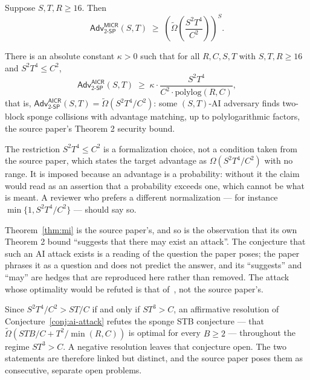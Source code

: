 \documentclass{conjura-conjecture}
\newcommand{\SP}{\mathsf{SP}}
\newcommand{\Adv}{\mathsf{Adv}}
\newcommand{\AICR}{\mathsf{AICR}}
\newcommand{\MICR}{\mathsf{MICR}}
\newcommand{\tOm}{\tilde{\Omega}}
\begin{document}
\begin{theorem}\label{thm:mi}
Suppose $S, T, R \ge 16$. Then
\[
  \Adv^{\MICR}_{2\text{-}\SP}(S,T)
  \;\ge\; \left(\tOm\!\left(\frac{S^{2}T^{4}}{C^{2}}\right)\right)^{S}.
\]
\end{theorem}

\begin{conjecture}\label{conj:ai-attack}
There is an absolute constant $\kappa > 0$ such that for all
$R, C, S, T$ with $S, T, R \ge 16$ and $S^{2}T^{4} \le C^{2}$,
\[
  \Adv^{\AICR}_{2\text{-}\SP}(S,T)
  \;\ge\; \kappa \cdot \frac{S^{2}T^{4}}{C^{2}
          \cdot \mathrm{polylog}(R,C)} ,
\]
that is, $\Adv^{\AICR}_{2\text{-}\SP}(S,T) =
\tOm(S^{2}T^{4}/C^{2})$: some $(S,T)$-AI adversary finds two-block
sponge collisions with advantage matching, up to polylogarithmic
factors, the source paper's Theorem 2 security bound.
\end{conjecture}

\begin{remark}\label{rem:sidecondition}
The restriction $S^{2}T^{4} \le C^{2}$ is a formalization choice, not a
condition taken from the source paper, which states the target
advantage as $\Omega(S^{2}T^{4}/C^{2})$ with no range. It is imposed
because an advantage is a probability: without it the claim would read
as an assertion that a probability exceeds one, which cannot be what is
meant. A reviewer who prefers a different normalization --- for
instance $\min\{1, S^{2}T^{4}/C^{2}\}$ --- should say so.
\end{remark}

\begin{remark}\label{rem:attribution}
Theorem~\ref{thm:mi} is the source paper's, and so is the observation
that its own Theorem 2 bound ``suggests that there may exist an
attack''. The conjecture that such an AI attack exists is a reading of
the question the paper poses; the paper phrases it as a question and
does not predict the answer, and its ``suggests'' and ``may'' are
hedges that are reproduced here rather than removed. The attack whose
optimality would be refuted is that of~\cite{FGK22}, not the source
paper's.
\end{remark}

\begin{remark}\label{rem:stb}
Since $S^{2}T^{4}/C^{2} > ST/C$ if and only if $ST^{3} > C$, an
affirmative resolution of Conjecture~\ref{conj:ai-attack} refutes the
sponge STB conjecture --- that $\tOm(STB/C + T^{2}/\min(R,C))$ is
optimal for every $B \ge 2$ --- throughout the regime $ST^{3} > C$. A
negative resolution leaves that conjecture open. The two statements
are therefore linked but distinct, and the source paper poses them as
consecutive, separate open problems.
\end{remark}
\end{document}
